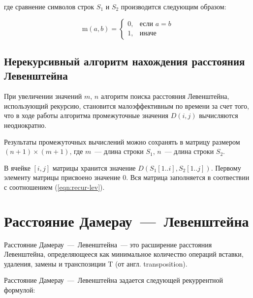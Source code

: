\noindent где сравнение символов строк $S_1$ и $S_2$ производится следующим образом:

\begin{equation}
    \text{m}(a, b) = 
    \begin{cases}
        0, &\text{если $a = b$}\\
        1, &\text{иначе}
    \end{cases}
\end{equation}

\subsection{Нерекурсивный алгоритм нахождения расстояния Левенштейна}
При увеличении значений $m$, $n$ алгоритм поиска расстояния Левенштейна, использующий рекурсию, становится малоэффективным по времени за счет того, что в ходе работы алгоритма промежуточные значения $D(i, j)$ вычисляются неоднократно.

Результаты промежуточных вычислений можно сохранять в матрицу размером $(n + 1) \times (m + 1)$, где $m$~--- длина строки $S_1$, $n$~--- длина строки $S_2$.

В ячейке $[i, j]$ матрицы хранится значение $D(S_1[1..i], S_2[1..j])$.
Первому элементу матрицы присвоено значение $0$.
Вся матрица заполняется в соотвествии с соотношением (\ref{eqn:recur-lev}).

\section{\texorpdfstring{Расстояние Дамерау~---~Левенштейна}{}}

Расстояние Дамерау~---~Левенштейна~--- это расширение расстояния Левенштейна, определяющееся как минимальное количество операций вставки, удаления, замены и транспозиции T (от англ. transposition).

Расстояние Дамерау~---~Левенштейна задается следующей рекуррентной формулой:

